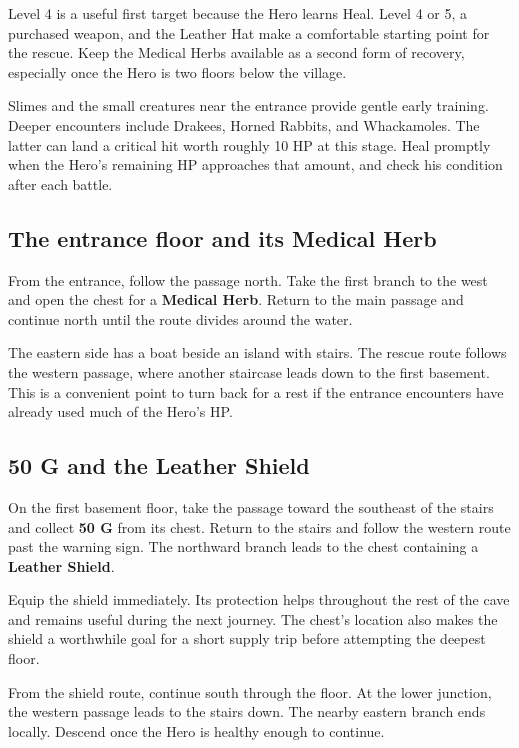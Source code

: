 Level 4 is a useful first target because the Hero learns Heal. Level 4 or
5, a purchased weapon, and the Leather Hat make a comfortable starting
point for the rescue. Keep the Medical Herbs available as a second form
of recovery, especially once the Hero is two floors below the village.

Slimes and the small creatures near the entrance provide gentle early
training. Deeper encounters include Drakees, Horned Rabbits, and
Whackamoles. The latter can land a critical hit worth roughly 10 HP at
this stage. Heal promptly when the Hero's remaining HP approaches that
amount, and check his condition after each battle.

\subsection*{The entrance floor and its Medical Herb}

From the entrance, follow the passage north. Take the first branch to
the west and open the chest for a \textbf{Medical Herb}. Return to the
main passage and continue north until the route divides around the water.

The eastern side has a boat beside an island with stairs. The rescue
route follows the western passage, where another staircase leads down
to the first basement. This is a convenient point to turn back for a
rest if the entrance encounters have already used much of the Hero's HP.

\subsection*{50 G and the Leather Shield}

On the first basement floor, take the passage toward the southeast of
the stairs and collect \textbf{50 G} from its chest. Return to the stairs
and follow the western route past the warning sign. The northward branch
leads to the chest containing a \textbf{Leather Shield}.

Equip the shield immediately. Its protection helps throughout the rest
of the cave and remains useful during the next journey. The chest's
location also makes the shield a worthwhile goal for a short supply trip
before attempting the deepest floor.

From the shield route, continue south through the floor. At the lower
junction, the western passage leads to the stairs down. The nearby eastern
branch ends locally. Descend once the Hero is healthy enough to continue.

